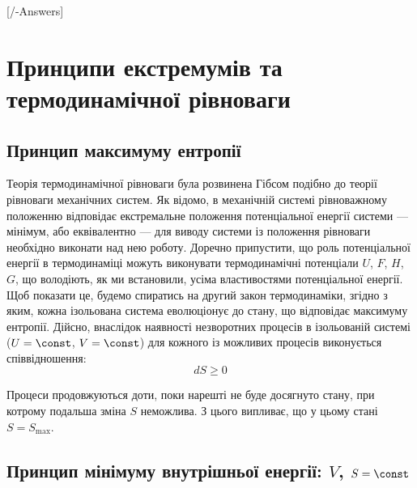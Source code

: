 
\setcounter{chapter}{6}

[\currfilebase/\currfilebase-Answers]
\chapter{Принципи екстремумів та термодинамічної рівноваги}\label{\currfilebase}
\graphicspath{{\currfilebase/pictures}}
\makeatletter
{}
\makeatother

\section{Принцип максимуму ентропії}

Теорія термодинамічної рівноваги була розвинена Гібсом подібно до теорії рівноваги механічних систем. Як відомо, в механічній системі рівноважному положенню відповідає екстремальне положення потенціальної енергії системи --- мінімум, або еквівалентно --- для виводу системи із положення рівноваги необхідно виконати над нею роботу. Доречно припустити, що роль потенціальної енергії в термодинаміці можуть виконувати термодинамічні потенціали $U$, $F$, $H$, $G$, що володіють, як ми встановили, усіма властивостями потенціальної енергії. Щоб показати це, будемо спиратись на другий закон термодинаміки, згідно з яким, кожна ізольована система еволюціонує до стану, що відповідає максимуму ентропії. Дійсно, внаслідок наявності незворотних процесів в ізольованій системі ($U = \const$, $V = \const$) для кожного із можливих процесів виконується співвідношення:
\begin{equation}\label{75_1}
    dS \ge 0
\end{equation}

Процеси продовжуються доти, поки нарешті не буде досягнуто стану, при котрому подальша зміна $S$ неможлива. З цього випливає, що у цьому стані $S = S_{\max}$.

\section{Принцип мінімуму внутрішньої енергії: %
\texorpdfstring{$V$, $S = \const$}{V, S = const}
}

